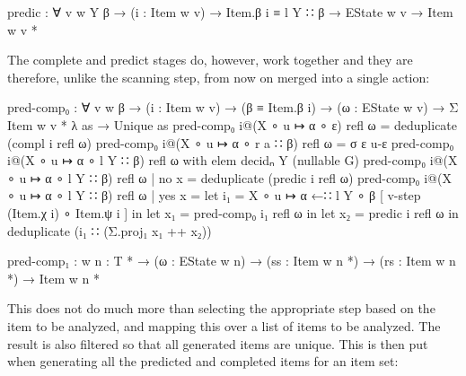 		\begin{code}
			  predic : ∀ {v w Y β} →
			    (i : Item w v) → Item.β i ≡ l Y ∷ β →
			    EState w v →
			    Item w v *
		\end{code}

		The complete and predict stages do, however, work together and they are
		therefore, unlike the scanning step, from now on merged into a single
		action:

		\begin{code}
			  pred-comp₀ : ∀ {v w β} →
			    (i : Item w v) →
			    (β ≡ Item.β i) →
			    (ω : EState w v) →
			    Σ {Item w v *} λ as → Unique as
			  pred-comp₀ i@(X ∘ u ↦ α ∘ ε) refl ω = deduplicate (compl i refl ω)
			  pred-comp₀ i@(X ∘ u ↦ α ∘ r a ∷ β) refl ω = σ ε u-ε
			  pred-comp₀ i@(X ∘ u ↦ α ∘ l Y ∷ β) refl ω with elem decidₙ Y (nullable G)
			  pred-comp₀ i@(X ∘ u ↦ α ∘ l Y ∷ β) refl ω | no x = deduplicate (predic i refl ω)
			  pred-comp₀ i@(X ∘ u ↦ α ∘ l Y ∷ β) refl ω | yes x =
			    let i₁ = X ∘ u ↦ α ←∷ l Y ∘ β [ v-step (Item.χ i) ∘ Item.ψ i ] in
			    let x₁ = pred-comp₀ i₁ refl ω in
			    let x₂ = predic i refl ω in
			    deduplicate (i₁ ∷ (Σ.proj₁ x₁ ++ x₂))

			  pred-comp₁ : {w n : T *} → (ω : EState w n) →
			    (ss : Item w n *) → (rs : Item w n *) → Item w n *
		\end{code}

		This does not do much more than selecting the appropriate step based on
		the item to be analyzed, and mapping this over a list of items to be
		analyzed. The result is also filtered so that all generated items are
		unique. This is then put when generating all the predicted and
		completed items for an item set:

